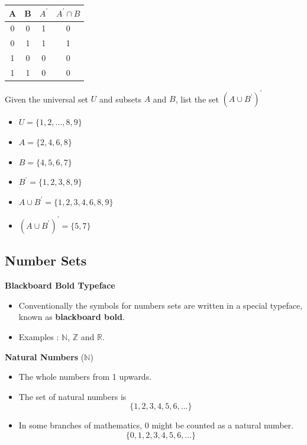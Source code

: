 \documentclass[]{report}
\begin{document}
\begin{enumerate}
\begin{tabular}{|c|c|| c | c| }
A&B&$A^{\prime}$&$A^{\prime} \cap B$\\\hline
0&0&1&0\\
0&1&1&1\\
1&0&0&0\\
1&1&0&0\\
\end{tabular}



Given the universal set $U$ and subsets $A$ and $B$, list the set $(A \cup B^{\prime})^{\prime}$
\begin{itemize}
\item $U=\{1,2,\ldots,8,9\}$
\item $A=\{2,4,6,8\}$
\item $B=\{ 4,5,6,7\}$
\item $B^{\prime}=\{ 1, 2, 3, 8, 9  \}$
\item $A \cup B^{\prime}=\{ 1, 2, 3,4, 6, 8, 9  \}$
\item $(A \cup B^{\prime})^{\prime}=\{ 5,7 \}$
\end{itemize}





\subsection{Number Sets}

\textbf{Blackboard Bold Typeface}

\begin{itemize}
\item Conventionally the symbols for numbers sets are written in a special typeface, known as \textbf{blackboard bold}.
\item Examples : $\mathbb{N}$, $\mathbb{Z}$ and $\mathbb{R}$.

\end{itemize}


\textbf{Natural Numbers} ($\mathbb{N}$)
\begin{itemize}
\item The whole numbers from 1 upwards. 

\item The set of natural numbers is 
\[\{1,2,3,4,5,6,\ldots\} \]
\item In some branches of mathematics, $0$ might be counted as a natural number.
\[\{0,1,2,3,4,5,6,\ldots\} \]
\end{itemize}


\end{enumerate}
\end{document}
